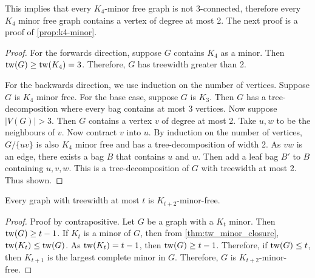 This implies that every $K_4$-minor free graph is not $3$-connected, therefore every $K_4$ minor free graph contains a vertex of degree at most 2. The next proof is a proof of \cref{prop:k4-minor}.

\begin{proof}
	For the forwards direction, suppose $G$ contains $K_4$ as a minor. Then $\operatorname{tw}(G) \geq \operatorname{tw}(K_4) = 3$. Therefore, $G$ has treewidth greater than 2. 

	For the backwards direction, we use induction on the number of vertices. Suppose $G$ is $K_4$ minor free. For the base case, suppose $G$ is $K_3$. Then $G$ has a tree-decomposition where every bag contains at most $3$ vertices. Now suppose $|V(G)| > 3$. Then $G$ contains a vertex $v$ of degree at most 2. Take $u, w$ to be the neighbours of $v$. Now contract $v$ into $u$. By induction on the number of vertices, $G / \{uv\}$ is also $K_4$ minor free and has a tree-decomposition of width 2. As $vw$ is an edge, there exists a bag $B$ that contains $u$ and $w$. Then add a leaf bag $B'$ to $B$ containing $u, v, w$. This is a tree-decomposition of $G$ with treewidth at most 2. Thus shown. 
\end{proof}




\begin{proposition}\label{thm:treewidth_clique-minor-free}
	Every graph with treewidth at most $t$ is $K_{t+2}$-minor-free. 
\end{proposition}
\begin{proof}
	Proof by contrapositive. Let $G$ be a graph with a $K_t$ minor. Then \(\operatorname{tw}(G) \geq t-1\).
	If \(K_t\) is a minor of \(G\), then from \cref{thm:tw_minor_closure}, \(\operatorname{tw}(K_t) \leq \operatorname{tw}(G)\). As \(\operatorname{tw}(K_t) = t-1\), then \(\operatorname{tw}(G) \geq t - 1\). Therefore, if $\operatorname{tw}(G) \leq t$, then $K_{t+1}$ is the largest complete minor in $G$. Therefore, $G$ is $K_{t + 2}$-minor-free. 
\end{proof}

